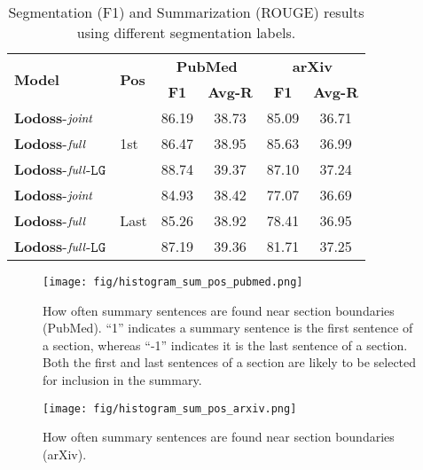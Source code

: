 \documentclass[11pt]{article}
\begin{document}
\begin{table}[!t]
\setlength{\tabcolsep}{4.5pt}
\renewcommand{\arraystretch}{1.1}
\centering
\footnotesize
\begin{footnotesize}
\begin{tabular}{|l|l|cc|cc|}
\hline
\multirow{2}{3em}{\textbf{Model}}& \multirow{2}{1.8em}{\textbf{Pos}} & \multicolumn{2}{c|}{\textbf{PubMed}} & \multicolumn{2}{c|}{\textbf{arXiv}}\\
 &  & \textbf{F1} & \textbf{Avg-R} & \textbf{F1} & \textbf{Avg-R}  \\
\hline
\hline
$\textbf{Lodoss}$-$\emph{joint}$ & \multirow{3}{1.0em}{1st} & 86.19 & 38.73 & 85.09 & 36.71 \\
$\textbf{Lodoss}$-$\emph{full}$ & & 86.47 & 38.95 & 85.63 & 36.99 \\
$\textbf{Lodoss}$-$\emph{full}$-$\texttt{LG}$ & & 88.74 & 39.37 & 87.10 & 37.24 \\
\hline
\hline
$\textbf{Lodoss}$-$\emph{joint}$ & \multirow{3}{1.0em}{Last} & 84.93 & 38.42 & 77.07 & 36.69 \\
$\textbf{Lodoss}$-$\emph{full}$ &  & 85.26 & 38.92 & 78.41 & 36.95 \\
$\textbf{Lodoss}$-$\emph{full}$-$\texttt{LG}$ & & 87.19 & 39.36 & 81.71 & 37.25 \\
\hline
\end{tabular}
\end{footnotesize}
\caption{Segmentation (F1) and Summarization (ROUGE) results using different segmentation labels.}
\label{tab:seg_rouge}
\vspace{-0.1in}
\end{table}


\begin{figure}[!t]	
\centering
\texttt{[image: fig/histogram\_sum\_pos\_pubmed.png]}    \vspace{-0.25in}
\caption{How often summary sentences are found near section boundaries (PubMed). 
``1'' indicates a summary sentence is the first sentence of a section,
whereas ``-1'' indicates it is the last sentence of a section.
Both the first and last sentences of a section are likely to be
selected for inclusion in the summary.
}
\label{fig:rela_sent_pos_pubmed}
\end{figure}

\begin{figure}[!t]	
	\centering
	\texttt{[image: fig/histogram\_sum\_pos\_arxiv.png]}  
	\vspace{-0.25in}
	\caption{How often summary sentences are found near section boundaries (arXiv).}
	\label{fig:rela_sent_pos_arxiv}
\end{figure}
\end{document}
